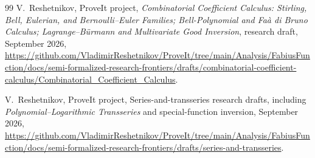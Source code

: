 \documentclass[11pt,oneside]{article}
\numberwithin{equation}{section}
\theoremstyle{plain}
\theoremstyle{definition}
\theoremstyle{remark}
\begin{document}
\begin{thebibliography}{99}
V.~Reshetnikov, ProveIt project,
\newblock \emph{Combinatorial Coefficient Calculus: Stirling, Bell,
Eulerian, and Bernoulli--Euler Families; Bell-Polynomial and Fa\`a di Bruno
Calculus; Lagrange--B\"urmann and Multivariate Good Inversion},
\newblock research draft, September 2026,
\newblock \url{https://github.com/VladimirReshetnikov/ProveIt/tree/main/Analysis/FabiusFunction/docs/semi-formalized-research-frontiers/drafts/combinatorial-coefficient-calculus/Combinatorial_Coefficient_Calculus}.

V.~Reshetnikov, ProveIt project,
\newblock Series-and-transseries research drafts, including
\emph{Polynomial--Logarithmic Transseries} and special-function inversion,
\newblock September 2026,
\newblock \url{https://github.com/VladimirReshetnikov/ProveIt/tree/main/Analysis/FabiusFunction/docs/semi-formalized-research-frontiers/drafts/series-and-transseries}.

\end{thebibliography}
\end{document}
